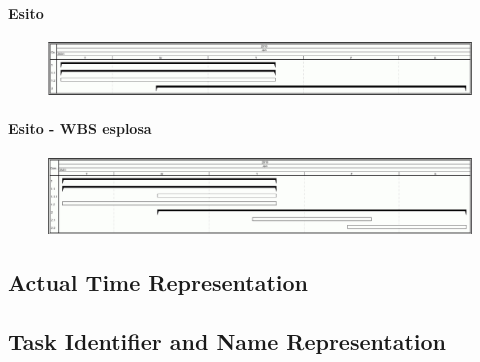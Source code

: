\paragraph{Esito}
\begin{figure}[h!]
\centering
\includegraphics[width=\textwidth]{tests/TEST_GANTT/3.2/ComposedTask_4.jpg}
\end{figure}

\paragraph{Esito - WBS esplosa}
\begin{figure}[h!]
\centering
\includegraphics[width=\textwidth]{tests/TEST_GANTT/3.2/ComposedTask_3.jpg}
\end{figure}
\newpage

\subsection{Actual Time Representation}


\subsection{Task Identifier and Name Representation}
